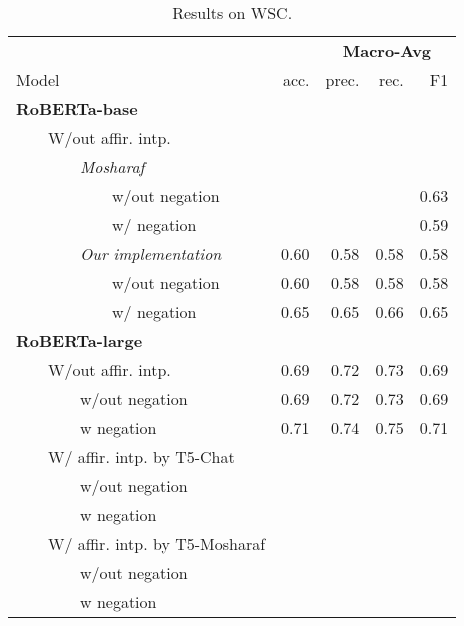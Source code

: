 \begin{table*}
\centering
\begin{tabular}{lrrrr}
\toprule
&& \multicolumn{3}{c}{\textbf{Macro-Avg}} \\
Model & acc. & prec. & rec. & F1 \\
\midrule
\textbf{RoBERTa-base} \\
~~~~W/out affir. intp. \\
~~~~~~~~\textit{Mosharaf} \\
~~~~~~~~~~~~w/out negation &&&&0.63\\ 
~~~~~~~~~~~~w/ negation &&&&0.59\\ 
\midrule
~~~~~~~~\textit{Our implementation}  & 0.60 & 0.58 & 0.58 & 0.58\\
~~~~~~~~~~~~w/out negation  & 0.60 & 0.58 & 0.58 & 0.58\\
~~~~~~~~~~~~w/ negation & 0.65 & 0.65 & 0.66 & 0.65 \\ 
\bottomrule
\textbf{RoBERTa-large} \\
~~~~W/out affir. intp.  & 0.69 & 0.72 & 0.73 & 0.69\\
~~~~~~~~w/out negation  & 0.69 & 0.72 & 0.73 & 0.69\\ 
~~~~~~~~w negation  & 0.71 & 0.74 & 0.75 & 0.71\\ 
\midrule
~~~~W/ affir. intp. by T5-Chat \\
~~~~~~~~w/out negation \\ 
~~~~~~~~w negation \\ 
\midrule
~~~~W/ affir. intp. by T5-Mosharaf \\
~~~~~~~~w/out negation \\ 
~~~~~~~~w negation \\ 
\bottomrule
\end{tabular}
\caption{Results on WSC.}
\end{table*}